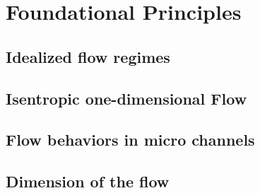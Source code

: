 \section{Foundational Principles}

\subsection{Idealized flow regimes}

\newpage

\subsection{Isentropic one-dimensional Flow}

\newpage

\subsection{Flow behaviors in micro channels}

\newpage

\subsection{Dimension of the flow}

\newpage
